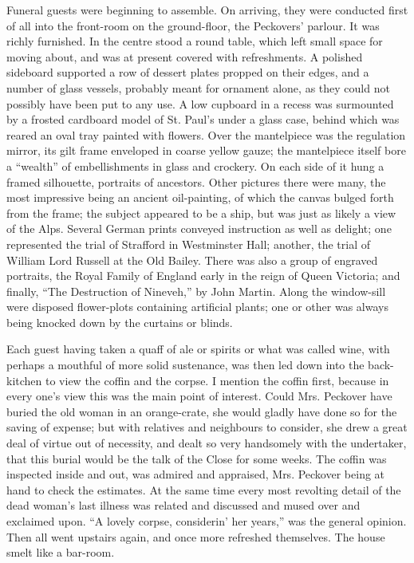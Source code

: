 Funeral guests were beginning to assemble. On arriving, they were
conducted first of all into the front-room on the ground-floor, the
Peckovers' parlour. It was richly furnished. In the centre stood a round
table, which left small space for moving about, and was at present
covered with refreshments. A polished sideboard supported a row of
dessert plates propped on their edges, and a number of glass vessels,
probably meant for ornament alone, as they could not possibly have been
put to any use. A low cupboard in a recess was surmounted by a frosted
cardboard model of St. Paul's under a glass case, behind which was
reared an oval tray painted with flowers. Over the mantelpiece was the
regulation mirror, its gilt frame enveloped in coarse yellow gauze; the
mantelpiece itself bore a ``wealth'' of embellishments in glass and
crockery. On each side of it hung a framed silhouette, portraits of
ancestors. Other pictures there were many, the most
{\protect\hypertarget{97}{}{}}impressive being an ancient oil-painting,
of which the canvas bulged forth from the frame; the subject appeared to
be a ship, but was just as likely a view of the Alps. Several German
prints conveyed instruction as well as delight; one represented the
trial of Strafford in Westminster Hall; another, the trial of William
Lord Russell at the Old Bailey. There was also a group of engraved
portraits, the Royal Family of England early in the reign of Queen
Victoria; and finally, ``The Destruction of Nineveh,'' by John Martin.
Along the window-sill were disposed flower-plots containing artificial
plants; one or other was always being knocked down by the curtains or
blinds.

Each guest having taken a quaff of ale or spirits or what was called
wine, with perhaps a mouthful of more solid sustenance, was then led
down into the back-kitchen to view the coffin and the corpse. I mention
the coffin first, because in every one's view this was the main point of
interest. Could Mrs. Peckover have buried the old woman
{\protect\hypertarget{98}{}{}}in an orange-crate, she would gladly have
done so for the saving of expense; but with relatives and neighbours to
consider, she drew a great deal of virtue out of necessity, and dealt so
very handsomely with the undertaker, that this burial would be the talk
of the Close for some weeks. The coffin was inspected inside and out,
was admired and appraised, Mrs. Peckover being at hand to check the
estimates. At the same time every most revolting detail of the dead
woman's last illness was related and discussed and mused over and
exclaimed upon. ``A lovely corpse, considerin' her years,'' was the
general opinion. Then all went upstairs again, and once more refreshed
themselves. The house smelt like a bar-room.

